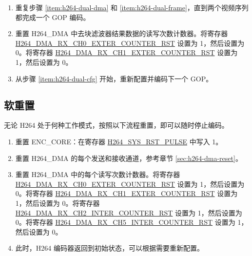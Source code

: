 \documentclass[main\_\_CN.tex]{subfiles}
\begin{document}
\begin{enumerate}
\begin{itemize}
\begin{itemize}
            \item 去块滤波器使能寄存器：\hyperref[fielddesc:H264ABYPASSDBFILTER]{H264\_A\_BYPASS\_DB\_FILTER}。
            \item ROI 功能相关寄存器，请参考 \ref{sec:h264-roi} 章节的描述。
            \item 与切片头信息相关的寄存器：\hyperref[fielddesc:H264SLICEREMAINBIT]{H264\_SLICE\_REMAIN\_BIT}、\hyperref[fielddesc:H264SLICEREMAINBITLENGTH]{H264\_SLICE\_REMAIN\_BITLENGTH}、\hyperref[fielddesc:H264SLICEBYTELENGTH]{H264\_SLICE\_BYTE\_LENGTH}、\hyperref[fielddesc:H264SLICEBYTELSB]{H264\_SLICE\_BYTE\_LSB} 和 \hyperref[fielddesc:H264SLICEBYTEMSB]{H264\_SLICE\_BYTE\_MSB}。
            \item 与 MV 合并功能相关的寄存器，请参考 \ref{sec:h264-mv-merge} 章节的描述。
        \end{itemize}
    \end{itemize}
    \item 重复步骤 \ref{item:h264-dual-dma} 和 \ref{item:h264-dual-frame}，直到两个视频序列都完成一个 GOP 编码。
    \item 重置 H264\_DMA 中去块滤波器结果数据的读写次数计数器。将寄存器 \hyperref[fielddesc:H264DMARXCH0EXTERCOUNTERRST]{H264\_DMA\_RX\_CH0\_EXTER\_COUNTER\_RST} 设置为 1，然后设置为 0。将寄存器 \hyperref[fielddesc:H264DMARXCH1EXTERCOUNTERRST]{H264\_DMA\_RX\_CH1\_EXTER\_COUNTER\_RST} 设置为 1，然后设置为 0。
    \item 从步骤 \ref{item:h264-dual-cfg} 开始，重新配置并编码下一个 GOP。
\end{enumerate}


\subsection{软重置}\label{sec:h264-soft-rst}
无论 H264 处于何种工作模式，按照以下流程重置，即可以随时停止编码。
\begin{enumerate}
    \item 重置 ENC\_CORE：在寄存器 \hyperref[fielddesc:H264SYSRSTPULSE]{H264\_SYS\_RST\_PULSE} 中写入 1。
    \item 重置 H264\_DMA 的每个发送和接收通道，参考章节 \ref{sec:h264-dma-reset}。
    \item 重置 H264\_DMA 中的每个读写次数计数器。将寄存器 \hyperref[fielddesc:H264DMARXCH0EXTERCOUNTERRST]{H264\_DMA\_RX\_CH0\_EXTER\_COUNTER\_RST} 设置为 1，然后设置为 0。将寄存器 \hyperref[fielddesc:H264DMARXCH1EXTERCOUNTERRST]{H264\_DMA\_RX\_CH1\_EXTER\_COUNTER\_RST} 设置为 1，然后设置为 0。将寄存器 \hyperref[fielddesc:H264DMARXCH2INTERCOUNTERRST]{H264\_DMA\_RX\_CH2\_INTER\_COUNTER\_RST} 设置为 1，然后设置为 0。将寄存器 \hyperref[fielddesc:H264DMARXCH5INTERCOUNTERRST]{H264\_DMA\_RX\_CH5\_INTER\_COUNTER\_RST} 设置为 1，然后设置为 0。
    \item 此时，H264 编码器返回到初始状态，可以根据需要重新配置。
\end{enumerate}
\end{document}
